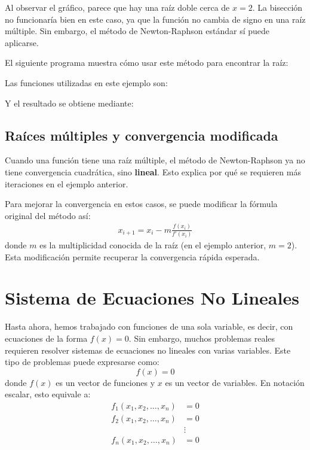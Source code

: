 \documentclass[12pt,letterpaper]{article}
\theoremstyle{definition}
\theoremstyle{plain}
\theoremstyle{remark}
\begin{document}
Al observar el gráfico, parece que hay una raíz doble cerca de $x = 2$. La bisección no funcionaría bien en este caso, ya que la función no cambia de signo en una raíz múltiple. Sin embargo, el método de Newton-Raphson estándar sí puede aplicarse.

El siguiente programa muestra cómo usar este método para encontrar la raíz:



Las funciones utilizadas en este ejemplo son:




Y el resultado se obtiene mediante:



\subsection{Raíces múltiples y convergencia modificada}

Cuando una función tiene una raíz múltiple, el método de Newton-Raphson ya no tiene convergencia cuadrática, sino {\bf lineal}. Esto explica por qué se requieren más iteraciones en el ejemplo anterior.

Para mejorar la convergencia en estos casos, se puede modificar la fórmula original del método así:
\begin{align}
x_{i+1} = x_i - m\frac{f(x_i)}{f'(x_i)} \label{eq:9}
\end{align}
donde $m$ es la multiplicidad conocida de la raíz (en el ejemplo anterior, $m = 2$). Esta modificación permite recuperar la convergencia rápida esperada.

\section{Sistema de Ecuaciones No Lineales}

Hasta ahora, hemos trabajado con funciones de una sola variable, es decir, con ecuaciones de la forma $f(x) = 0$. Sin embargo, muchos problemas reales requieren resolver sistemas de ecuaciones no lineales con varias variables. Este tipo de problemas puede expresarse como:
\[
f(x) = 0
\]
donde $f(x)$ es un vector de funciones y $x$ es un vector de variables. En notación escalar, esto equivale a:
\begin{align*}
f_1(x_1,x_2,\ldots,x_n)&=0\\
f_2(x_1,x_2,\ldots,x_n)&=0\\
&\vdots\\
f_n(x_1,x_2,\ldots,x_n)&=0
\end{align*}
\end{document}
